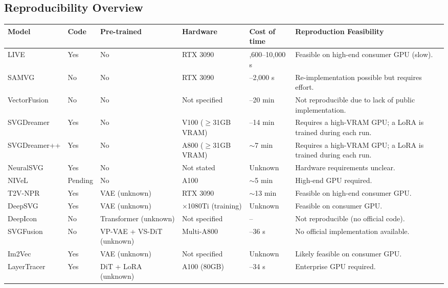 \begin{landscape}
\section{Reproducibility Overview}
\label{app:reproducibility}

\begin{center}
\small
{}
\label{tab:app_reproducibility}
\begin{tabularx}{\linewidth}{>{\raggedright\arraybackslash}p{2.85cm} >{\raggedright\arraybackslash}p{1.52cm} >{\raggedright\arraybackslash}p{3.33cm} >{\raggedright\arraybackslash}p{3.19cm} >{\raggedright\arraybackslash}p{2.75cm} >{\raggedright\arraybackslash}X}
\toprule
\textbf{Model} & \textbf{Code} & \textbf{Pre-trained} & \textbf{Hardware} & \textbf{Cost of time} & \textbf{Reproduction Feasibility} \\
\midrule
LIVE & Yes & No & RTX 3090 & 2,600--10,000 s & Feasible on high-end consumer GPU (slow). \\
SAMVG & No & No & RTX 3090 & 139--2,000 s & Re-implementation possible but requires effort. \\
VectorFusion & No & No & Not specified & 10--20 min & Not reproducible due to lack of public implementation. \\
SVGDreamer & Yes & No & V100 ($\geq$31GB VRAM) & 7--14 min & Requires a high-VRAM GPU; a LoRA is trained during each run. \\
SVGDreamer++ & Yes & No & A800 ($\geq$31GB VRAM) & $\sim$7 min & Requires a high-VRAM GPU; a LoRA is trained during each run. \\
NeuralSVG & Yes & No & Not stated & Unknown & Hardware requirements unclear. \\
NIVeL & Pending & No & A100 & $\sim$5 min & High-end GPU required. \\
T2V-NPR & Yes & VAE (unknown)& RTX 3090 & $\sim$13 min & Feasible on high-end consumer GPU. \\
DeepSVG & Yes & VAE (unknown) & 2×1080Ti (training) & Unknown & Feasible on consumer GPU. \\
DeepIcon & No & Transformer (unknown) & Not specified & -- & Not reproducible (no official code). \\
SVGFusion & No & VP-VAE + VS-DiT (unknown) & Multi-A800 & 24--36 s & No official implementation available. \\
Im2Vec & Yes & VAE (unknown) & Not specified & Unknown & Likely feasible on consumer GPU. \\
LayerTracer & Yes & DiT + LoRA (unknown) & A100 (80GB) & 27--34 s & Enterprise GPU required. \\
\bottomrule
\end{tabularx}
\end{center}
\end{landscape}

